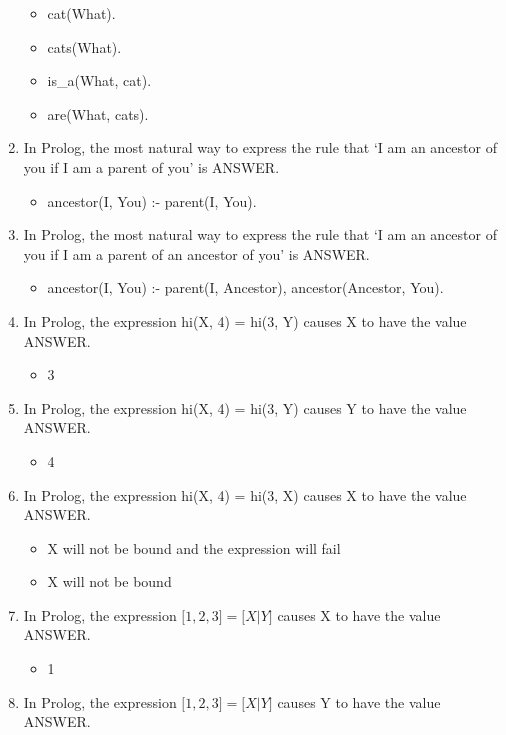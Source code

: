 \documentclass{exam}
\begin{document}
\begin{enumerate}
\begin{itemize}
\item cat(What).
\item cats(What).
\item is\_a(What, cat).
\item are(What, cats).
\end{itemize}
\item In Prolog, the most natural way to express the rule that `I am an ancestor of you if I am a parent of you' is ANSWER.
\begin{itemize}
\item ancestor(I, You) :- parent(I, You).
\end{itemize}
\item In Prolog, the most natural way to express the rule that `I am an ancestor of you if I am a parent of an ancestor of you' is ANSWER.
\begin{itemize}
\item ancestor(I, You) :- parent(I, Ancestor), ancestor(Ancestor, You). 
\end{itemize}
\item In Prolog, the expression hi(X, 4) = hi(3, Y) causes X to have the value ANSWER.
\begin{itemize}
\item 3
\end{itemize}
\item In Prolog, the expression hi(X, 4) = hi(3, Y) causes Y to have the value ANSWER.
\begin{itemize}
\item 4
\end{itemize}
\item In Prolog, the expression hi(X, 4) = hi(3, X) causes X to have the value ANSWER.
\begin{itemize}
\item X will not be bound and the expression will fail
\item X will not be bound
\end{itemize}
\item In Prolog, the expression $\lbrack 1, 2, 3\rbrack = \lbrack X | Y\rbrack$ causes X to have the value ANSWER.
\begin{itemize}
\item 1
\end{itemize}
\item In Prolog, the expression $\lbrack 1, 2, 3\rbrack = \lbrack X | Y\rbrack$ causes Y to have the value ANSWER.
\begin{itemize}

\end{itemize}
\end{enumerate}
\end{document}
